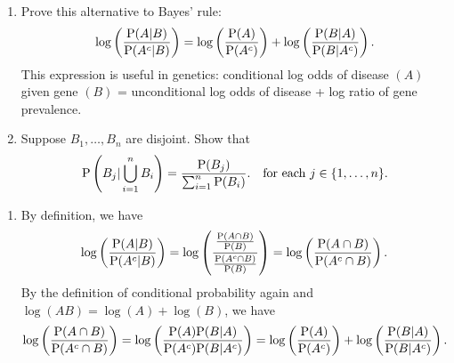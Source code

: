 \documentclass[12pt]{article}
\newcommand{\Prob}{{\rm P}}
\newenvironment{problem}[2][Problem]{\begin{trivlist}
\item[\hskip \labelsep {\bfseries #1}\hskip \labelsep {\bfseries #2.}]}
{\end{trivlist}}
\begin{document}
\begin{problem}{2}
  \begin{enumerate}
    \item Prove this alternative to Bayes' rule:
    \[
      \log\left(\frac{\Prob(A|B)}{\Prob(A^c|B)}\right)
      = \log\left(\frac{\Prob(A)}{\Prob(A^c)}\right)
      + \log\left(\frac{\Prob(B|A)}{\Prob(B|A^c)}\right).
    \]
    This expression is useful in genetics: conditional log odds of disease
    $(A)$ given gene $(B)$ = unconditional log odds of disease + log ratio
    of gene prevalence.
    \item Suppose $B_1,\dots,B_n$ are disjoint. Show that
    \[
      \Prob\left(B_j|\bigcup_{i=1}^n B_i\right) = \frac{\Prob(B_j)}
      {\sum_{i=1}^n \Prob(B_i)}. \quad \text{for each } j \in \{1,\dots,n\}.
    \]
  \end{enumerate}
  \begin{enumerate}
    \item By definition, we have
    \[
      \log\left(\frac{\Prob(A|B)}{\Prob(A^c|B)}\right)
      = \log\left(\frac{\frac{\Prob(A\cap B)}{\Prob(B)}}
      {\frac{\Prob(A^c\cap B)}{\Prob(B)}}\right)
      = \log\left(\frac{\Prob(A\cap B)}{\Prob(A^c\cap B)}\right).
    \]
    By the definition of conditional probability again and
    $\log(AB) = \log(A)+\log(B)$, we have
    \[
      \log\left(\frac{\Prob(A\cap B)}{\Prob(A^c\cap B)}\right)
      = \log\left(\frac{\Prob(A)\Prob(B|A)}{\Prob(A^c)\Prob(B|A^c)}\right)
      = \log\left(\frac{\Prob(A)}{\Prob(A^c)}\right)
      + \log\left(\frac{\Prob(B|A)}{\Prob(B|A^c)}\right).
    \]
  \end{enumerate}
\end{problem}

\end{document}
